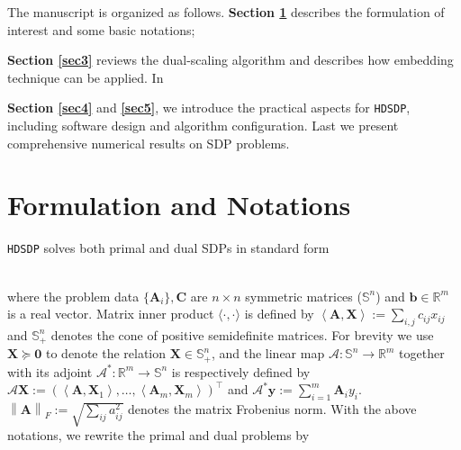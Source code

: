 The manuscript is organized as follows. \textbf{Section \ref{sec2}} 
describes the formulation of interest and some basic notations;
{\textbf{Section \ref{sec3}} reviews the dual-scaling algorithm
and describes how embedding technique can be applied. 
In {\textbf{Section \ref{sec4}} and \textbf{\ref{sec5}}, we introduce the practical aspects for {{\texttt{HDSDP}}}, including software design and algorithm configuration.  Last we present comprehensive numerical results on SDP problems.

\section{Formulation and Notations} \label{sec2}

{{\texttt{HDSDP}}} solves both primal and dual SDPs in standard form

{}\\

where the problem data $\{\mathbf{A}_i\}, \mathbf{C}$ are $n \times n$ symmetric matrices
($\mathbb{S}^n$) and $\mathbf{b} \in \mathbb{R}^m$ is a real vector. Matrix inner
product $\langle \cdot, \cdot \rangle$ is defined by $\left\langle \mathbf{A}, \mathbf{X} \right\rangle := \sum_{i, j}
c_{i j} x_{i j}$ and $\mathbb{S}_+^n$ denotes the cone of positive
semidefinite matrices. For brevity we use $\mathbf{X} \succeq \textbf{0}$ to denote the
relation $\mathbf{X} \in \mathbb{S}_+^n$, and the linear map $\mathcal{A} : \mathbb{S}^n
\rightarrow \mathbb{R}^m$ together with its adjoint $\mathcal{A}^{\ast} : \mathbb{R}^m
\rightarrow \mathbb{S}^n$ is respectively defined by $\mathcal{A} \mathbf{X} := \left(
\left\langle \mathbf{A}, \mathbf{X}_1 \right\rangle, \ldots, \left\langle \mathbf{A}_m, \mathbf{X}_m
\right\rangle \right)^{\top}$ and $\mathcal{A}^{\ast} \mathbf{y} := \sum_{i = 1}^m \mathbf{A}_i
y_i$. $\left\| \mathbf{A} \right\|_F := \sqrt{\sum_{i j} a_{i j}^2}$ denotes the
matrix Frobenius norm. With the above notations, we rewrite the primal and
dual problems by

}}
